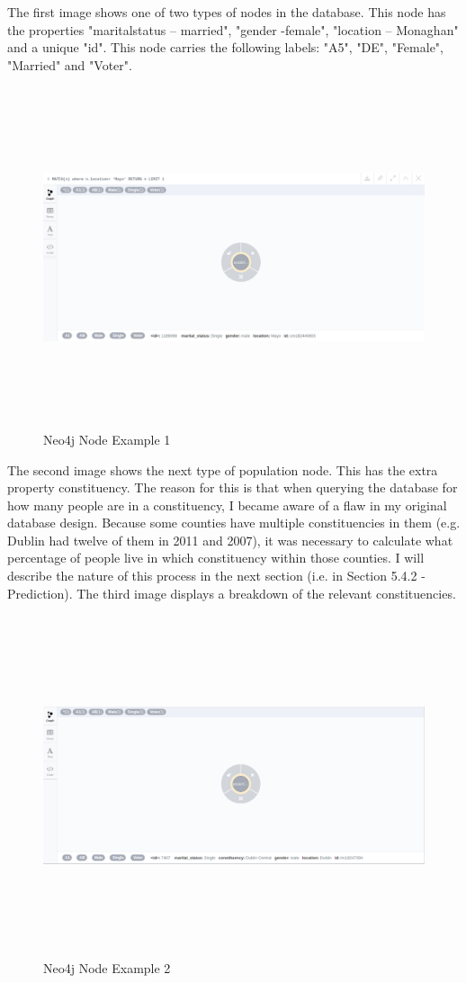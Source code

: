 The first image shows one of two types of nodes in the database. This node has the properties "marital\textunderscore status – married", "gender -female", "location – Monaghan" and a unique "id".  This node carries the following labels: "A5", "DE", "Female", "Married" and "Voter". 
\begin{figure}[h]
	\caption{Neo4j Node Example 1}
	\centering
	\includegraphics[width=15cm, height=10cm]{img/neo4j-noconst}
\end{figure}
\pagebreak

The second image shows the next type of  population node. This has the extra property constituency. The reason for this is that when querying the database for how many people are in a constituency, I became aware of a flaw in my original database design. Because some counties have multiple constituencies in them (e.g. Dublin had twelve of them in 2011 and 2007), it was necessary to calculate what percentage of people live in which constituency within those counties. I will describe the nature of this process in the next section (i.e. in Section 5.4.2 - Prediction). The third image displays a breakdown of the relevant constituencies. 
\begin{figure}[h]
	\caption{Neo4j Node Example 2}
	\centering
	\includegraphics[width=15cm, height=10cm]{img/neo4j-const}
\end{figure}
\pagebreak

